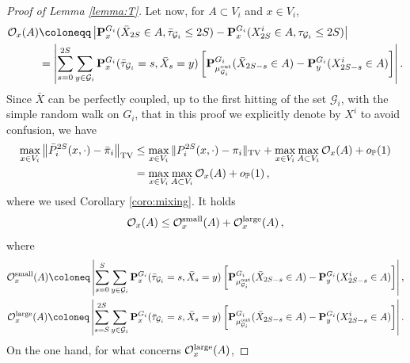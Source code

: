 \documentclass[11pt,oneside]{amsart}
\numberwithin{equation}{section}  %
\theoremstyle{plain}
\newcommand{\p}{\mathbb{P}}
\newcommand{\op}{o_{\p}}
\newcommand{\quench}{\mathbf{P}}
\newcommand{\gates}{\mathcal{G}}
\newcommand{\muout}{\mu^{\rm out}_{\gates_i}}
\begin{document}
\begin{proof}[Proof of Lemma \ref{lemma:T}]
Let now, for $A \subset V_i $ and $x \in V_i$,
\begin{equation}
\begin{split}
    \mathcal{O}_{x}(A)
    &\coloneqq\left|{\quench}^{G_i}_x(\bar X_{2S}\in A,\bar{\tau}_{\gates_i}\le 2S)-\quench^{G_i}_x( X^i_{2S}\in A,{\tau}_{\gates_i}\le 2S) \right|\\
    &=\left|\sum_{s=0}^{2S} \sum_{y\in\gates_i}{\quench}^{G_i}_x(\bar{\tau}_{\gates_i}=s,\bar X_s=y)\left[{\quench}^{G_i}_{\muout}(\bar X_{{2S}-s}\in A)-\quench^{G_i}_y(X^i_{{2S}-s}\in A) \right]\right|.
\end{split}
\end{equation}
 Since $\bar X$ can be perfectly coupled, up to the first hitting of the set $\gates_i$, with the simple random walk on $G_i$, that in this proof we explicitly denote by $X^i$
 to avoid confusion, we have
 \begin{equation}\label{eq:mix2}
 	\begin{split}
 	\max_{x \in V_i}\left\|\bar{P}_i^{2S}(x,\cdot)-\bar\pi_i\right\|_{\rm TV}&\le\max_{x\in V_i}\|P_i^{2S}(x,\cdot)-\pi_i \|_{\rm TV}+\max_{x\in V_i}\max_{A\subset V_i}\mathcal{O}_{x}(A)+\op(1)\\
 	&=\max_{x\in V_i}\max_{A\subset V_i}\mathcal{O}_{x}(A)+\op(1)\,,
 	\end{split}
 \end{equation}
 where we used Corollary \ref{coro:mixing}.
It holds
%
\begin{equation}\label{eq:OxA}
 	\begin{split}
 	\mathcal{O}_{x}(A)\le \mathcal{O}^{\rm small}_x(A)+\mathcal{O}^{\rm large}_x(A)\,,
 \end{split}
 \end{equation}
 where
 \begin{equation*} \begin{split}
\mathcal{O}^{\rm small}_x(A) \coloneq \left|\sum_{s=0}^{S} \sum_{y\in\gates_i}{\quench}^{G_i}_x(\bar{\tau}_{\gates_i}=s,\bar X_s=y)\left[{\quench}^{G_i}_{\muout}(\bar X_{{2S}-s}\in A)-\quench^{G_i}_y(X^i_{{2S}-s}\in A) \right]\right|, \\
 	\mathcal{O}^{\rm large}_x(A)\coloneq\left|\sum_{s=S}^{2S} \sum_{y\in\gates_i}\quench^{G_i}_x(\bar{{\tau}}_{\gates_i}=s, \bar{X}_s=y)\left[{\quench}^{G_i}_{\muout}(\bar X_{{2S}-s}\in A)-\quench^{G_i}_y(X^i_{{2S}-s}\in A) \right]\right|.
     \end{split}
     \end{equation*}
 On the one hand, for what concerns $\mathcal{O}^{\rm large}_x(A)$,

\end{proof}
\end{document}
